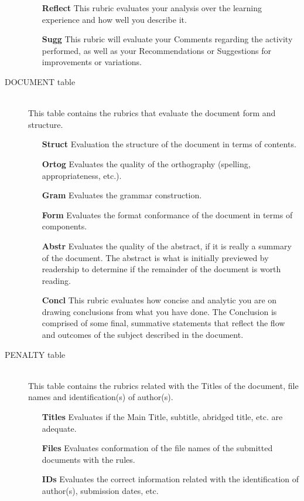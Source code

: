 \documentclass[a4paper,12pt,journal,twoside,compsoc]{PPIEEEtran}
\begin{document}
\begin{description}
\begin{itemize}
\item[\textbf{Reflect}] This rubric evaluates your analysis over the learning experience and how well you describe it.
\item[\textbf{Sugg}] This rubric will evaluate your Comments regarding the activity performed, as well as your Recommendations or Suggestions for improvements or variations.
\end{itemize}
\item[DOCUMENT table] \hfill \\
This table contains the rubrics that evaluate the document form and structure.
\begin{itemize}
\item[\textbf{Struct}] Evaluation the structure of the document in terms of contents.
\item[\textbf{Ortog}] Evaluates the quality of the orthography (spelling, appropriateness, etc.).
\item[\textbf{Gram}] Evaluates the grammar construction.
\item[\textbf{Form}] Evaluates the format conformance of the document in terms of components.
\item[\textbf{Abstr}] Evaluates the quality of the abstract, if it is really a summary of the document. The abstract is what is initially previewed by readership to determine if the remainder of the document is worth reading. 
\item[\textbf{Concl}] This rubric evaluates how concise and analytic you are on drawing conclusions from what you have done. The Conclusion is comprised of some final, summative statements that reflect the flow and outcomes of the subject described in the document. 
\end{itemize}
\item[PENALTY table] \hfill \\
This table contains the rubrics related with the Titles of the document, file names and identification(s) of  author(s).
\begin{itemize}
\item[\textbf{Titles}] Evaluates if the Main Title, subtitle, abridged title, etc. are adequate.
\item[\textbf{Files}] Evaluates conformation of the file names of the submitted documents with the rules.
\item[\textbf{IDs}] Evaluates the correct information related with the identification of author(s), submission dates, etc.
\end{itemize}
\end{description}
\end{document}
